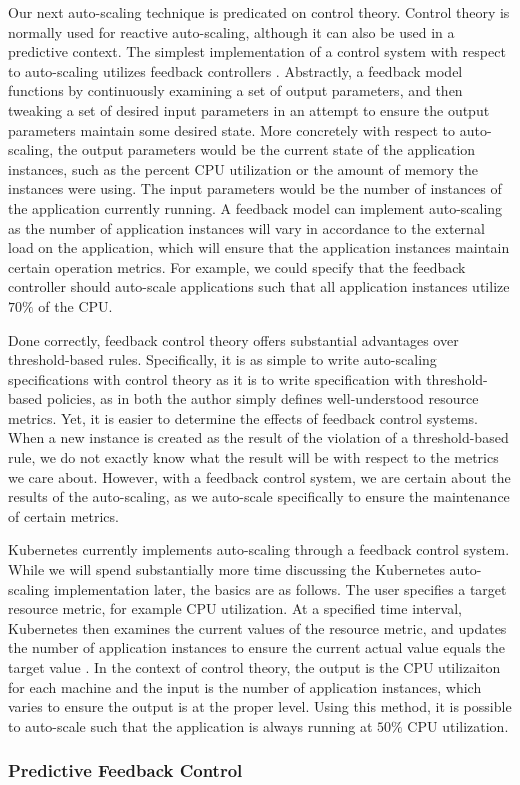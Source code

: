 Our next auto-scaling technique is predicated on control
theory. Control theory is normally used for reactive auto-scaling, although it
can also be used in a predictive context. The simplest implementation of a
control system with respect to auto-scaling utilizes feedback
controllers
\cite{auto-scaling-techniques-for-elastic-applications-in-cloud-environments}.
Abstractly, a feedback model functions by continuously examining a set of output parameters,
and then tweaking a set of desired input parameters in an attempt to ensure the
output parameters maintain some desired state. More concretely with respect to
auto-scaling, the output parameters would be the current state of the
application instances, such as the percent CPU utilization or the amount of
memory the instances were using. The input parameters would be the
number of instances of the application currently running. A feedback model
can implement auto-scaling as the number of application instances will vary in
accordance to the external load on the application, which will ensure that the
application instances maintain certain operation metrics. For example, we could
specify that the feedback controller should auto-scale applications such that
all application instances utilize $70\%$ of the CPU.

Done correctly, feedback control theory offers substantial advantages over
threshold-based rules. Specifically, it is as simple to write auto-scaling
specifications with control theory as it is to write specification with
threshold-based policies, as in both the author simply defines well-understood
resource metrics. Yet, it is easier to determine the effects of feedback
control systems. When a new instance is created as the result of the violation
of a threshold-based rule, we do not exactly know what the result will be with
respect to the metrics we care about. However, with a feedback control system,
we are certain about the results of the auto-scaling, as we auto-scale
specifically to ensure the maintenance of certain metrics.

Kubernetes currently implements auto-scaling through a feedback control system.
While we will spend substantially more time discussing the Kubernetes auto-scaling
implementation later, the basics are as follows. The user specifies a target resource
metric, for example CPU utilization. At a specified time interval,
Kubernetes then examines the current values
of the resource metric, and updates the number of application instances to
ensure the current actual value equals the target
value \cite{k8s-horizontal-pod-autoscaler-proposal}. In the context of control
theory, the output is the CPU utilizaiton for each machine and the input is the
number of application instances, which varies to ensure the output is at the
proper level. Using this method, it is possible to auto-scale such that the
application is always running at $50\%$ CPU utilization.

\subsubsection{Predictive Feedback Control}


